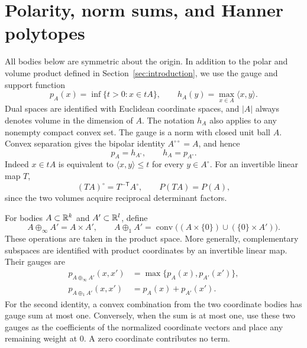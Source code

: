 \section{Polarity, norm sums, and Hanner polytopes}\label{sec:convex}

All bodies below are symmetric about the origin. In addition to the
polar and volume product defined in Section~\ref{sec:introduction}, we use
the gauge and support function
\[
 p_A(x)=\inf\{t>0:x\in tA\},\qquad
 h_A(y)=\max_{x\in A}\langle x,y\rangle.
\]
Dual spaces are identified with Euclidean coordinate spaces, and
$|A|$ always denotes volume in the dimension of $A$. The notation $h_A$
also applies to any nonempty compact convex set. The gauge is a
norm with closed unit ball $A$. Convex separation gives the bipolar
identity $A^{\circ\circ}=A$, and hence
\begin{equation}\label{eq:gauge-support}
 p_A=h_{A^\circ},\qquad h_A=p_{A^\circ}.
\end{equation}
Indeed $x\in tA$ is equivalent to
$\langle x,y\rangle\le t$ for every $y\in A^\circ$.
For an invertible linear map $T$,
\begin{equation}\label{eq:linear-polarity}
 (TA)^\circ=T^{-\mathsf T}A^\circ,
 \qquad P(TA)=P(A),
\end{equation}
since the two volumes acquire reciprocal determinant factors.

For bodies $A\subset\mathbb R^k$ and $A'\subset\mathbb R^l$, define
\[
 A\oplus_\infty A'=A\times A',\qquad
 A\oplus_1 A'=\operatorname{conv}
       \bigl((A\times\{0\})\cup(\{0\}\times A')\bigr).
\]
These operations are taken in the product space. More generally,
complementary subspaces are identified with product coordinates by an
invertible linear map. Their gauges are
\begin{equation}\label{eq:sum-gauges}
 \begin{split}
 p_{A\oplus_\infty A'}(x,x')&=\max\{p_A(x),p_{A'}(x')\},\\
 p_{A\oplus_1 A'}(x,x')&=p_A(x)+p_{A'}(x').
 \end{split}
\end{equation}
For the second identity, a convex combination from the two coordinate
bodies has gauge sum at most one. Conversely, when the sum is at most
one, use these two gauges as the coefficients of the normalized
coordinate vectors and place any remaining weight at $0$. A zero
coordinate contributes no term.


